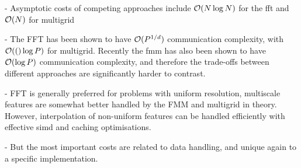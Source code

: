 - Asymptotic costs of competing approaches include $\mathcal{O}(N \log{N})$ for the \acrshort{fft} and $\mathcal{O}(N)$ for multigrid

- The FFT has been shown to have $\mathcal{O}(P^{1/d})$ communication complexity, with $\mathcal{O}(()\log{P})$ for multigrid. Recently the \acrshort{fmm} has also been shown to have $\mathcal{O}(\log{P})$ communication complexity, and therefore the trade-offs between different approaches are significantly harder to contrast.

- FFT is generally preferred for problems with uniform resolution, multiscale features are somewhat better handled by the FMM and multigrid in theory. However, interpolation of non-uniform features can be handled efficiently with effective \acrshort{simd} and caching optimisations.

- But the most important costs are related to data handling, and unique again to a specific implementation.